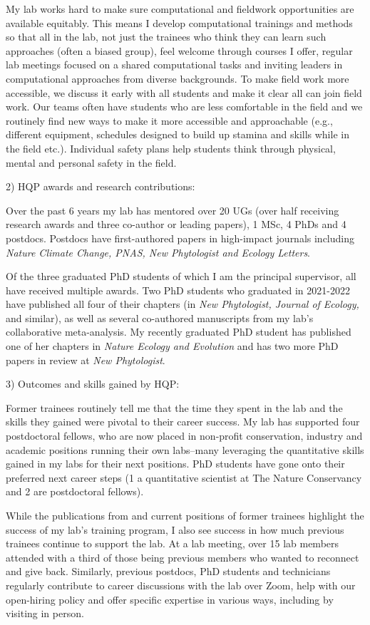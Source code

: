 \documentclass[12pt,oneside]{article}
\begin{document}
My lab works hard to make sure computational and fieldwork opportunities are available equitably. This means I develop computational trainings and methods so that all in the lab, not just the trainees who think they can learn such approaches (often a biased group), feel welcome through courses I offer, regular lab meetings focused on a shared computational tasks and inviting leaders in computational approaches from diverse backgrounds. To make field work more accessible, we discuss it early with all students and make it clear all can join field work. Our teams often have students who are less comfortable in the field and we routinely find new ways to make it more accessible and approachable (e.g., different equipment, schedules designed to build up stamina and skills while in the field etc.). Individual safety plans help students think through physical, mental and personal safety in the field.

2) HQP awards and research contributions:

Over the past 6 years my lab has mentored over 20 UGs (over half receiving research awards and three co-author or leading papers), 1 MSc, 4 PhDs and 4 postdocs. Postdocs have first-authored papers in high-impact journals including \emph{Nature Climate Change, PNAS, New Phytologist and Ecology Letters}.

Of the three graduated PhD students of which I am the principal supervisor, all have received multiple awards. Two PhD students who graduated in 2021-2022 have published all four of their chapters (in \emph{New Phytologist, Journal of Ecology,} and similar), as well as several co-authored manuscripts from my lab's collaborative meta-analysis. My recently graduated PhD student has published one of her chapters in \emph{Nature Ecology and Evolution} and has two more PhD papers in review at \emph{New Phytologist}. 

3) Outcomes and skills gained by HQP:

Former trainees routinely tell me that the time they spent in the lab and the skills they gained were pivotal to their career success. My lab has supported four postdoctoral fellows, who are now placed in non-profit conservation, industry and academic positions running their own labs--many leveraging the quantitative skills gained in my labs for their next positions. PhD students have gone onto their preferred next career steps (1 a quantitative scientist at The Nature Conservancy and 2 are postdoctoral fellows).

While the publications from and current positions of former trainees highlight the success of my lab's training program, I also see success in how much previous trainees continue to support the lab. At a lab meeting, over 15 lab members attended with a third of those being previous members who wanted to reconnect and give back. Similarly, previous postdocs, PhD students and technicians regularly contribute to career discussions with the lab over Zoom, help with our open-hiring policy and offer specific expertise in various ways, including by visiting in person.   
\end{document}
